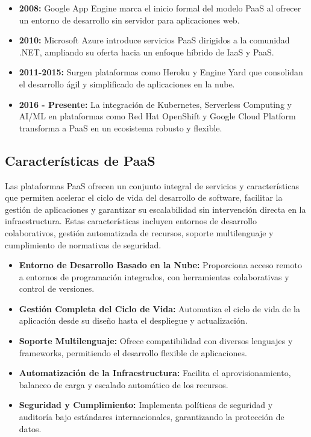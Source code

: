 {            \begin{itemize}
                \item \textbf{2008:} Google App Engine marca el inicio formal del modelo PaaS al ofrecer un entorno de desarrollo sin servidor para aplicaciones web.
                \item \textbf{2010:} Microsoft Azure introduce servicios PaaS dirigidos a la comunidad .NET, ampliando su oferta hacia un enfoque híbrido de IaaS y PaaS.
                \item \textbf{2011-2015:} Surgen plataformas como Heroku y Engine Yard que consolidan el desarrollo ágil y simplificado de aplicaciones en la nube.
                \item \textbf{2016 - Presente:} La integración de Kubernetes, Serverless Computing y AI/ML en plataformas como Red Hat OpenShift y Google Cloud Platform transforma a PaaS en un ecosistema robusto y flexible.
            \end{itemize}
            
        \subsection{Características de PaaS}
            Las plataformas PaaS ofrecen un conjunto integral de servicios y características que permiten acelerar el ciclo de vida del desarrollo de software, facilitar la gestión de aplicaciones y garantizar su escalabilidad sin intervención directa en la infraestructura. Estas características incluyen entornos de desarrollo colaborativos, gestión automatizada de recursos, soporte multilenguaje y cumplimiento de normativas de seguridad.
            
            \begin{itemize}
                \item \textbf{Entorno de Desarrollo Basado en la Nube:} Proporciona acceso remoto a entornos de programación integrados, con herramientas colaborativas y control de versiones.
                \item \textbf{Gestión Completa del Ciclo de Vida:} Automatiza el ciclo de vida de la aplicación desde su diseño hasta el despliegue y actualización.
                \item \textbf{Soporte Multilenguaje:} Ofrece compatibilidad con diversos lenguajes y frameworks, permitiendo el desarrollo flexible de aplicaciones.
                \item \textbf{Automatización de la Infraestructura:} Facilita el aprovisionamiento, balanceo de carga y escalado automático de los recursos.
                \item \textbf{Seguridad y Cumplimiento:} Implementa políticas de seguridad y auditoría bajo estándares internacionales, garantizando la protección de datos.
            \end{itemize}
            
}
